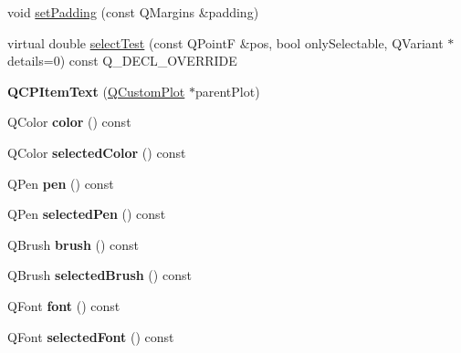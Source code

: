 \begin{DoxyCompactItemize}
\item 
void \hyperlink{class_q_c_p_item_text_aeea8a3e01f135f9dd0bb08f51db66310}{set\+Padding} (const Q\+Margins \&padding)
\item 
virtual double \hyperlink{class_q_c_p_item_text_a676aaec10ad3cc4d7d0e4847db04c838}{select\+Test} (const Q\+PointF \&pos, bool only\+Selectable, Q\+Variant $\ast$details=0) const Q\+\_\+\+D\+E\+C\+L\+\_\+\+O\+V\+E\+R\+R\+I\+DE
\item 
\mbox{\label{class_q_c_p_item_text_a77ff96a2972a00872ff8f8c67143abbe}} 
{\bfseries Q\+C\+P\+Item\+Text} (\hyperlink{class_q_custom_plot}{Q\+Custom\+Plot} $\ast$parent\+Plot)
\item 
\mbox{\label{class_q_c_p_item_text_a071ec7567ae4deae2262a5b861df7d54}} 
Q\+Color {\bfseries color} () const
\item 
\mbox{\label{class_q_c_p_item_text_a6e13d5497ea634fe1ee9f4aac94f664c}} 
Q\+Color {\bfseries selected\+Color} () const
\item 
\mbox{\label{class_q_c_p_item_text_a7039d313069547682f28688448333979}} 
Q\+Pen {\bfseries pen} () const
\item 
\mbox{\label{class_q_c_p_item_text_a852a79afa0e88e29e11474d323440126}} 
Q\+Pen {\bfseries selected\+Pen} () const
\item 
\mbox{\label{class_q_c_p_item_text_a2600b9b419f17e2e2381f5ed8267da62}} 
Q\+Brush {\bfseries brush} () const
\item 
\mbox{\label{class_q_c_p_item_text_a300770cc32acf3e92763651803482563}} 
Q\+Brush {\bfseries selected\+Brush} () const
\item 
\mbox{\label{class_q_c_p_item_text_a44a564431890ffdfe0f978f8732cfb81}} 
Q\+Font {\bfseries font} () const
\item 
\mbox{\label{class_q_c_p_item_text_a74c947c6193e3b47884fac84fdb29922}} 
Q\+Font {\bfseries selected\+Font} () const
\item 
\mbox{\label{class_q_c_p_item_text_ad71c9e83ee3556d9d617eca854e8eb18}} 

\end{DoxyCompactItemize}
